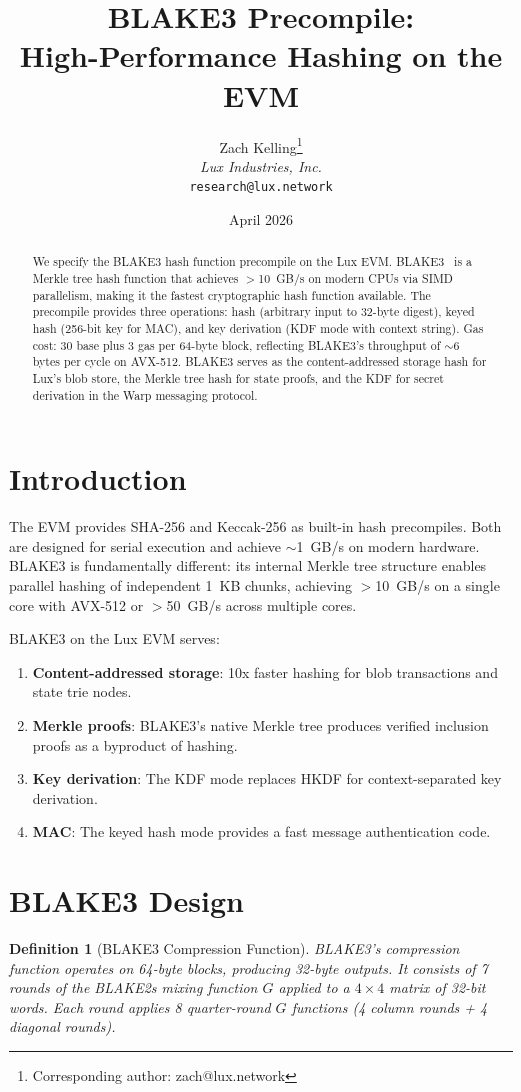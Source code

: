 \documentclass[11pt,a4paper]{article}
\title{BLAKE3 Precompile:\\High-Performance Hashing on the EVM}
\author{
Zach Kelling\thanks{Corresponding author: zach@lux.network}\\
\textit{Lux Industries, Inc.}\\
\texttt{research@lux.network}
}
\date{April 2026}
\newtheorem{definition}{Definition}
\begin{document}
\luxcoverpage

\begin{abstract}
We specify the BLAKE3 hash function precompile on the Lux EVM. BLAKE3~\cite{blake3}
is a Merkle tree hash function that achieves $>$10~GB/s on modern CPUs via
SIMD parallelism, making it the fastest cryptographic hash function available.
The precompile provides three operations: hash (arbitrary input to 32-byte digest),
keyed hash (256-bit key for MAC), and key derivation (KDF mode with context string).
Gas cost: 30 base plus 3 gas per 64-byte block, reflecting BLAKE3's throughput
of $\sim$6 bytes per cycle on AVX-512. BLAKE3 serves as the content-addressed
storage hash for Lux's blob store, the Merkle tree hash for state proofs, and
the KDF for secret derivation in the Warp messaging protocol.
\end{abstract}

\section{Introduction}

The EVM provides SHA-256 and Keccak-256 as built-in hash precompiles. Both are
designed for serial execution and achieve $\sim$1~GB/s on modern hardware. BLAKE3
is fundamentally different: its internal Merkle tree structure enables parallel
hashing of independent 1~KB chunks, achieving $>$10~GB/s on a single core with
AVX-512 or $>$50~GB/s across multiple cores.

BLAKE3 on the Lux EVM serves:
\begin{enumerate}[label=(\roman*)]
  \item \textbf{Content-addressed storage}: 10x faster hashing for blob
    transactions and state trie nodes.
  \item \textbf{Merkle proofs}: BLAKE3's native Merkle tree produces
    verified inclusion proofs as a byproduct of hashing.
  \item \textbf{Key derivation}: The KDF mode replaces HKDF for
    context-separated key derivation.
  \item \textbf{MAC}: The keyed hash mode provides a fast message
    authentication code.
\end{enumerate}

\section{BLAKE3 Design}

\begin{definition}[BLAKE3 Compression Function]
BLAKE3's compression function operates on 64-byte blocks, producing 32-byte
outputs. It consists of 7 rounds of the BLAKE2s mixing function $G$ applied
to a $4 \times 4$ matrix of 32-bit words. Each round applies 8 quarter-round
$G$ functions (4 column rounds + 4 diagonal rounds).
\end{definition}
\end{document}
